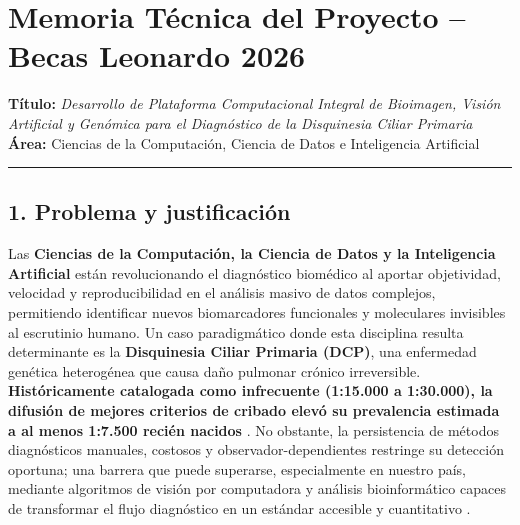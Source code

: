 \documentclass[11pt,letterpaper]{article}
\begin{document}
\section*{Memoria Técnica del Proyecto -- Becas Leonardo 2026}

\textbf{Título:} \textit{Desarrollo de Plataforma Computacional Integral de Bioimagen, Visión Artificial y Genómica para el Diagnóstico de la Disquinesia Ciliar Primaria} \\
\textbf{Área:} Ciencias de la Computación, Ciencia de Datos e Inteligencia Artificial \\

\hrule

\subsection*{1. Problema y justificación}

Las \textbf{Ciencias de la Computación, la Ciencia de Datos y la Inteligencia Artificial} están revolucionando el diagnóstico biomédico al aportar objetividad, velocidad y reproducibilidad en el análisis masivo de datos complejos, permitiendo identificar nuevos biomarcadores funcionales y moleculares invisibles al escrutinio humano. Un caso paradigmático donde esta disciplina resulta determinante es la \textbf{Disquinesia Ciliar Primaria (DCP)}, una enfermedad genética heterogénea que causa daño pulmonar crónico irreversible. \textbf{Históricamente catalogada como infrecuente (1:15.000 a 1:30.000), la difusión de mejores criterios de cribado elevó su prevalencia estimada a al menos 1:7.500 recién nacidos} \cite{Robson2025,Collison2025}. No obstante, la persistencia de métodos diagnósticos manuales, costosos y observador-dependientes restringe su detección oportuna; una barrera que puede superarse, especialmente en nuestro país, mediante algoritmos de visión por computadora y análisis bioinformático capaces de transformar el flujo diagnóstico en un estándar accesible y cuantitativo \cite{Shapiro2015,Wrona2025}.

\end{document}
